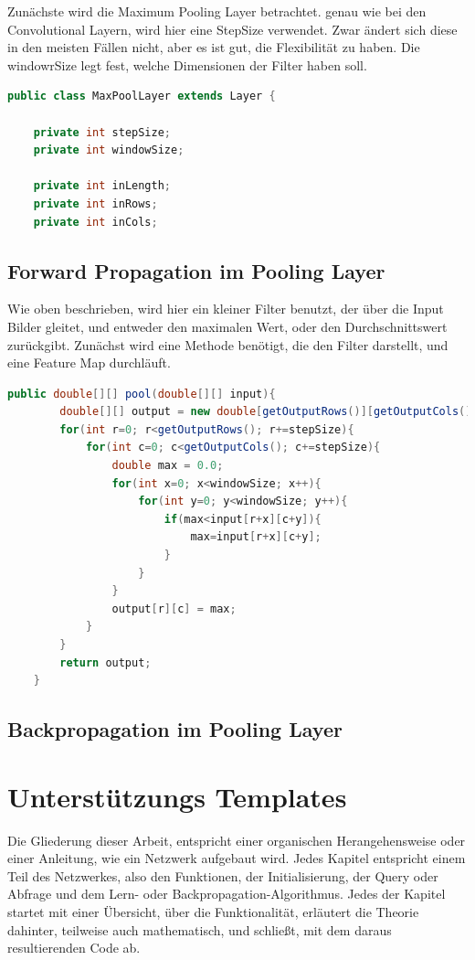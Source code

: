 \documentclass[12pt]{article}
\begin{document}
Zunächste wird die Maximum Pooling Layer betrachtet.
genau wie bei den Convolutional Layern, wird hier eine StepSize verwendet. Zwar ändert sich diese in den meisten Fällen nicht, aber es ist gut, die Flexibilität zu haben.
Die windowrSize legt fest, welche Dimensionen der Filter haben soll.
\begin{lstlisting}[language=Java]
public class MaxPoolLayer extends Layer {

    private int stepSize;
    private int windowSize;

    private int inLength;
    private int inRows;
    private int inCols;
\end{lstlisting}

\subsection{Forward Propagation im Pooling Layer}
Wie oben beschrieben, wird hier ein kleiner Filter benutzt, der über die Input Bilder gleitet, und entweder den maximalen Wert, oder den Durchschnittswert zurückgibt. 
Zunächst wird eine Methode benötigt, die den Filter darstellt, und eine Feature Map durchläuft. 

\begin{lstlisting}[language=Java]
 public double[][] pool(double[][] input){
        double[][] output = new double[getOutputRows()][getOutputCols()];
        for(int r=0; r<getOutputRows(); r+=stepSize){
            for(int c=0; c<getOutputCols(); c+=stepSize){
                double max = 0.0;
                for(int x=0; x<windowSize; x++){
                    for(int y=0; y<windowSize; y++){
                        if(max<input[r+x][c+y]){
                            max=input[r+x][c+y];
                        }
                    }
                }
                output[r][c] = max;
            }
        }
        return output;
    }
\end{lstlisting}


\subsection{Backpropagation im Pooling Layer}


\cleardoublepage
\section{Unterstützungs Templates}
Die Gliederung dieser Arbeit, entspricht einer organischen Herangehensweise oder einer Anleitung, wie ein Netzwerk aufgebaut wird. Jedes Kapitel entspricht einem Teil des Netzwerkes, also den Funktionen, der Initialisierung, der Query oder Abfrage und dem Lern- oder Backpropagation-Algorithmus. Jedes der Kapitel startet mit einer Übersicht, über die Funktionalität, erläutert die Theorie dahinter, teilweise auch mathematisch, und schließt, mit dem daraus resultierenden Code ab. 
\end{document}
